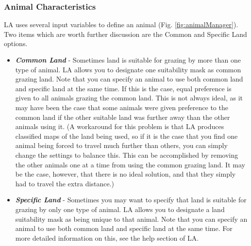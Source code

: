     \subsubsection{Animal Characteristics}
      LA uses several input variables  to define an animal (Fig.
      \ref{fig:animalManager}).  Two items which are worth further discussion
      are the Common and Specific Land options.
      \begin{itemize}
        \item \textit{\textbf{Common Land}} - Sometimes land is suitable for
          grazing by more than one type of animal. LA allows you to
          designate one suitability mask as common grazing land. Note that you
          can specify an animal to use both common land and specific land at the
          same time. If this is the case, equal preference is given to all
          animals grazing the common land. This is not always ideal, as it may
          have been the case that some animals were given preference to the
          common land if the other suitable land was further away than the other
          animals using it.  (A workaround for this problem is that LA
          produces classified maps of the land being used, so if it is
          the case that you find one animal being forced to travel much further
          than others, you can simply change the settings to balance this. This
          can be accomplished by removing the other animals one at a time from
          using the common grazing land. It may be the case, however, that there is no
          ideal solution, and that they simply had to travel the extra
          distance.)
        \item \textit{\textbf{Specific Land}} - Sometimes you may want to
          specify that land is suitable for grazing by only one type of animal.
          LA allows you to designate a land suitability mask as
          being unique to that animal.  Note that you can specify an animal to
          use both common land and specific land at the same time. For more
          detailed information on this, see the help section of LA.
      \end{itemize}

